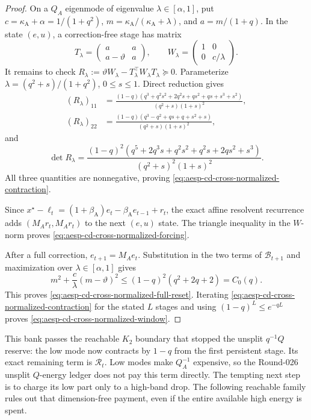 \begin{proof}
On a $Q_A$ eigenmode of eigenvalue $\lambda\in[\alpha,1]$, put
$c=\kappa_{\mathrm A}+\alpha=1/(1+q^2)$,
$m=\kappa_{\mathrm A}/(\kappa_{\mathrm A}+\lambda)$, and
$a=m/(1+q)$.  In the state $(e,u)$, a correction-free stage has matrix
\begin{equation*}
 T_\lambda=
 \begin{pmatrix}a&a\\a-\vartheta&a\end{pmatrix},
 \qquad
 W_\lambda=\begin{pmatrix}1&0\\0&c/\lambda\end{pmatrix}.
\end{equation*}
It remains to check
$R_\lambda:=\vartheta W_\lambda-T_\lambda^\top W_\lambda T_\lambda
\succeq0$.  Parameterize
$\lambda=(q^2+s)/(1+q^2)$, $0\leq s\leq1$.  Direct reduction gives
\begin{align*}
 (R_\lambda)_{11}
 &=\frac{(1-q)(q^3+q^2s^2+2q^2s+qs^2+qs+s^3+s^2)}
 {(q^2+s)(1+s)^2},\\
 (R_\lambda)_{22}
 &=\frac{(1-q)(q^3-q^2+qs+q+s^2+s)}
 {(q^2+s)(1+s)^2},
\end{align*}
and
\begin{equation*}
 \det R_\lambda
 =\frac{(1-q)^2
 (q^5+2q^3s+q^2s^2+q^2s+2qs^2+s^3)}
 {(q^2+s)^2(1+s)^2}.
\end{equation*}
All three quantities are nonnegative, proving
\cref{eq:aesp-cd-cross-normalized-contraction}.

Since $x^\star-\ell_t=(1+\beta_{\mathrm A})e_t
-\beta_{\mathrm A}e_{t-1}+r_t$, the exact affine resolvent recurrence adds
$(M_Ar_t,M_Ar_t)$ to the next $(e,u)$ state.  The triangle inequality in the
$W$-norm proves \cref{eq:aesp-cd-cross-normalized-forcing}.

After a full correction, $e_{t+1}=M_Ae_t$.  Substitution in the two terms of
$\mathcal B_{t+1}$ and maximization over
$\lambda\in[\alpha,1]$ gives
\begin{equation*}
 m^2+\frac c\lambda(m-\vartheta)^2
 \leq(1-q)^2(q^2+2q+2)=C_0(q).
\end{equation*}
This proves \cref{eq:aesp-cd-cross-normalized-full-reset}.  Iterating
\cref{eq:aesp-cd-cross-normalized-contraction} for the stated $L$ stages and
using $(1-q)^L\leq e^{-qL}$ proves
\cref{eq:aesp-cd-cross-normalized-window}.
\end{proof}

This bank passes the reachable $K_2$ boundary that stopped the unsplit
$q^{-1}Q$ reserve: the low mode now contracts by $1-q$ from the first
persistent stage.  Its exact remaining term is
$\mathcal R_t$.  Low modes make $Q_A^{-1}$ expensive, so the Round-026
unsplit $Q$-energy ledger does not pay this term directly.  The tempting next
step is to charge its low part only to a high-band drop.  The following
reachable family rules out that dimension-free payment, even if the entire
available high energy is spent.

